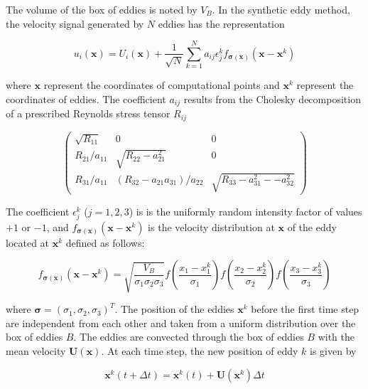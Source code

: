 \noindent The volume of the box of eddies is noted by $V_B$. In the synthetic eddy method, the velocity signal generated by $N$ eddies has the representation

\begin{equation} \label{SEMvelocity}
u_i(\boldsymbol{x}) = U_i(\boldsymbol{x}) + \frac{1}{\sqrt{N}}\sum_{k=1}^N a_{ij} \epsilon_j^k f_{\boldsymbol{\sigma}(\boldsymbol{x})}(\boldsymbol{x}-\boldsymbol{x}^k)
\end{equation}

\noindent where $\boldsymbol{x}$ represent the coordinates of computational points and $\boldsymbol{x}^k$ represent the coordinates of eddies. The coefficient $a_{ij}$ results from the Cholesky decomposition of a prescribed Reynolds stress tensor $R_{ij}$

\begin{equation} \label{LundCoefficients}
\left(\begin{matrix}
\sqrt{R_{11}} & 0 & 0 \\
R_{21}/a_{11} & \sqrt{R_{22}-a_{21}^2} & 0 \\
R_{31}/a_{11}  & (R_{32}-a_{21}a_{31})/a_{22} & \sqrt{R_{33}-a_{31}^2--a_{32}^2}
\end{matrix}\right)
\end{equation}

\noindent The coefficient $\epsilon_j^k$ ($j=1,2,3$) is is the uniformly random intensity factor of values $+1$ or $-1$, and $f_{\boldsymbol{\sigma}(\boldsymbol{x})} (\boldsymbol{x}-\boldsymbol{x}^k)$ is the velocity distribution at $\boldsymbol{x}$ of the eddy located at $\boldsymbol{x}^k$ defined as follows:

\begin{equation} \label{velocityShape}
f_{\boldsymbol{\sigma}(\boldsymbol{x})} (\boldsymbol{x}-\boldsymbol{x}^k) = \sqrt{\frac{V_B}{\sigma_1\sigma_2\sigma_3}}f\left(\frac{x_1-x_1^k}{\sigma_1}\right)f\left(\frac{x_2-x_2^k}{\sigma_2}\right)f\left(\frac{x_3-x_3^k}{\sigma_3}\right)
\end{equation}

\noindent where $\boldsymbol{\sigma}=(\sigma_1,\sigma_2,\sigma_3)^T$. The position of the eddies $\boldsymbol{x}^k$ before the first time step are independent from each other and taken from a uniform distribution over the box of eddies $B$. The eddies are convected through the box of eddies $B$ with the mean velocity $\boldsymbol{U}(\boldsymbol{x})$. At each time step, the new position of eddy $k$ is given by

\begin{equation}
\boldsymbol{x}^k(t+\varDelta t) = \boldsymbol{x}^k(t)+\boldsymbol{U}(\boldsymbol{x}^k)\varDelta t
\end{equation}


